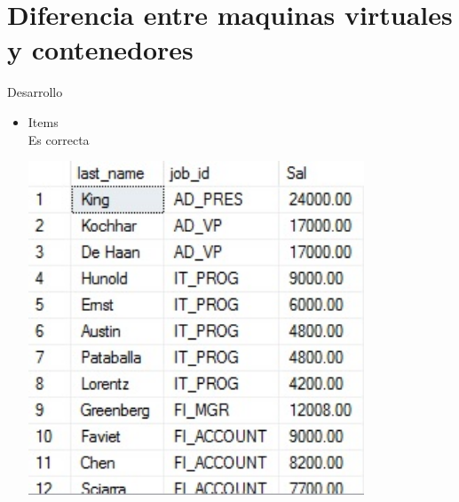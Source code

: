 \section{Diferencia entre maquinas virtuales y contenedores} 
Desarrollo

\begin{itemize}
	\item Items
	\\Es correcta
	\begin{center}
	\includegraphics[width=10cm]{./Imagenes/actividad0101} 
	\end{center}



\end{itemize} 